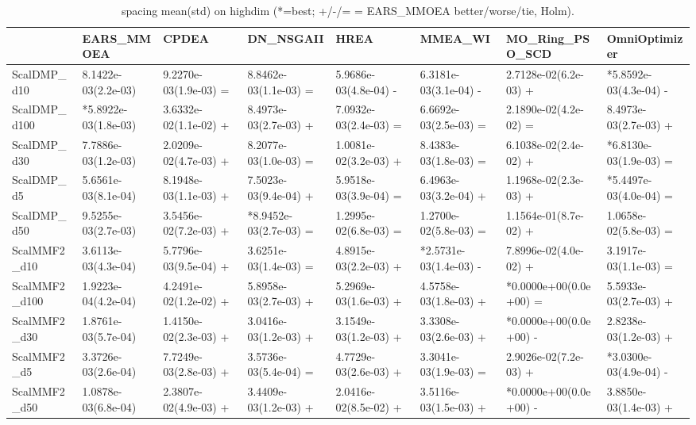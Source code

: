 \begin{table}[t]
\centering
\caption{spacing mean(std) on highdim (*=best; +/-/= = EARS_MMOEA better/worse/tie, Holm).}
\label{tab:highdim_spacing}
\begin{tabular}{llllllll}
\toprule
 & EARS\_MMOEA & CPDEA & DN\_NSGAII & HREA & MMEA\_WI & MO\_Ring\_PSO\_SCD & OmniOptimizer \\
\midrule
ScalDMP\_d10 & 8.1422e-03(2.2e-03) & 9.2270e-03(1.9e-03) = & 8.8462e-03(1.1e-03) = & 5.9686e-03(4.8e-04) - & 6.3181e-03(3.1e-04) - & 2.7128e-02(6.2e-03) + & *5.8592e-03(4.3e-04) - \\
ScalDMP\_d100 & *5.8922e-03(1.8e-03) & 3.6332e-02(1.1e-02) + & 8.4973e-03(2.7e-03) + & 7.0932e-03(2.4e-03) = & 6.6692e-03(2.5e-03) = & 2.1890e-02(4.2e-02) = & 8.4973e-03(2.7e-03) + \\
ScalDMP\_d30 & 7.7886e-03(1.2e-03) & 2.0209e-02(4.7e-03) + & 8.2077e-03(1.0e-03) = & 1.0081e-02(3.2e-03) + & 8.4383e-03(1.8e-03) = & 6.1038e-02(2.4e-02) + & *6.8130e-03(1.9e-03) = \\
ScalDMP\_d5 & 5.6561e-03(8.1e-04) & 8.1948e-03(1.1e-03) + & 7.5023e-03(9.4e-04) + & 5.9518e-03(3.9e-04) = & 6.4963e-03(3.2e-04) + & 1.1968e-02(2.3e-03) + & *5.4497e-03(4.0e-04) = \\
ScalDMP\_d50 & 9.5255e-03(2.7e-03) & 3.5456e-02(7.2e-03) + & *8.9452e-03(2.7e-03) = & 1.2995e-02(6.8e-03) = & 1.2700e-02(5.8e-03) = & 1.1564e-01(8.7e-02) + & 1.0658e-02(5.8e-03) = \\
ScalMMF2\_d10 & 3.6113e-03(4.3e-04) & 5.7796e-03(9.5e-04) + & 3.6251e-03(1.4e-03) = & 4.8915e-03(2.2e-03) + & *2.5731e-03(1.4e-03) - & 7.8996e-02(4.0e-02) + & 3.1917e-03(1.1e-03) = \\
ScalMMF2\_d100 & 1.9223e-04(4.2e-04) & 4.2491e-02(1.2e-02) + & 5.8958e-03(2.7e-03) + & 5.2969e-03(1.6e-03) + & 4.5758e-03(1.8e-03) + & *0.0000e+00(0.0e+00) = & 5.5933e-03(2.7e-03) + \\
ScalMMF2\_d30 & 1.8761e-03(5.7e-04) & 1.4150e-02(2.3e-03) + & 3.0416e-03(1.2e-03) + & 3.1549e-03(1.2e-03) + & 3.3308e-03(2.6e-03) + & *0.0000e+00(0.0e+00) - & 2.8238e-03(1.2e-03) + \\
ScalMMF2\_d5 & 3.3726e-03(2.6e-04) & 7.7249e-03(2.8e-03) + & 3.5736e-03(5.4e-04) = & 4.7729e-03(2.6e-03) + & 3.3041e-03(1.9e-03) = & 2.9026e-02(7.2e-03) + & *3.0300e-03(4.9e-04) - \\
ScalMMF2\_d50 & 1.0878e-03(6.8e-04) & 2.3807e-02(4.9e-03) + & 3.4409e-03(1.2e-03) + & 2.0416e-02(8.5e-02) + & 3.5116e-03(1.5e-03) + & *0.0000e+00(0.0e+00) - & 3.8850e-03(1.4e-03) + \\
\bottomrule
\end{tabular}
\end{table}
